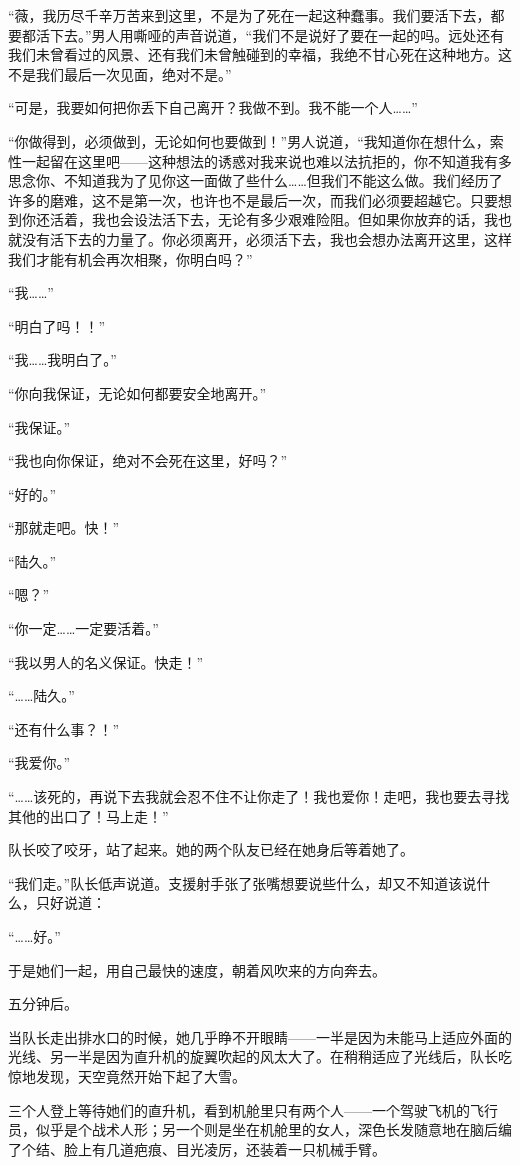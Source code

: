 “薇，我历尽千辛万苦来到这里，不是为了死在一起这种蠢事。我们要活下去，都要都活下去。”男人用嘶哑的声音说道，“我们不是说好了要在一起的吗。远处还有我们未曾看过的风景、还有我们未曾触碰到的幸福，我绝不甘心死在这种地方。这不是我们最后一次见面，绝对不是。”

“可是，我要如何把你丢下自己离开？我做不到。我不能一个人……”

“你做得到，必须做到，无论如何也要做到！”男人说道，“我知道你在想什么，索性一起留在这里吧——这种想法的诱惑对我来说也难以法抗拒的，你不知道我有多思念你、不知道我为了见你这一面做了些什么……但我们不能这么做。我们经历了许多的磨难，这不是第一次，也许也不是最后一次，而我们必须要超越它。只要想到你还活着，我也会设法活下去，无论有多少艰难险阻。但如果你放弃的话，我也就没有活下去的力量了。你必须离开，必须活下去，我也会想办法离开这里，这样我们才能有机会再次相聚，你明白吗？”

“我……”

“明白了吗！！”

“我……我明白了。”

“你向我保证，无论如何都要安全地离开。”

“我保证。”

“我也向你保证，绝对不会死在这里，好吗？”

“好的。”

“那就走吧。快！”

“陆久。”

“嗯？”

“你一定……一定要活着。”

“我以男人的名义保证。快走！”

“……陆久。”

“还有什么事？！”

“我爱你。”

“……该死的，再说下去我就会忍不住不让你走了！我也爱你！走吧，我也要去寻找其他的出口了！马上走！”

队长咬了咬牙，站了起来。她的两个队友已经在她身后等着她了。

“我们走。”队长低声说道。支援射手张了张嘴想要说些什么，却又不知道该说什么，只好说道：

“……好。”

于是她们一起，用自己最快的速度，朝着风吹来的方向奔去。

五分钟后。

当队长走出排水口的时候，她几乎睁不开眼睛——一半是因为未能马上适应外面的光线、另一半是因为直升机的旋翼吹起的风太大了。在稍稍适应了光线后，队长吃惊地发现，天空竟然开始下起了大雪。

三个人登上等待她们的直升机，看到机舱里只有两个人——一个驾驶飞机的飞行员，似乎是个战术人形；另一个则是坐在机舱里的女人，深色长发随意地在脑后编了个结、脸上有几道疤痕、目光凌厉，还装着一只机械手臂。

